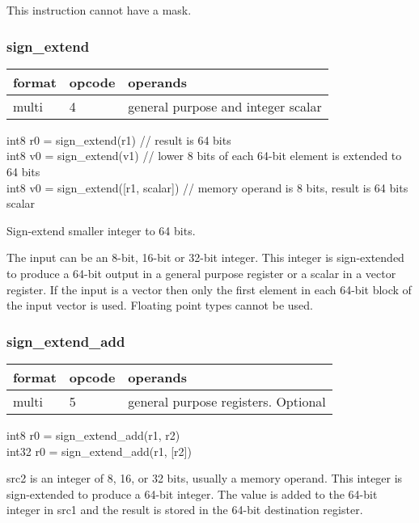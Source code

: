 \documentclass[forwardcom.tex]{subfiles}
\begin{document}
This instruction cannot have a mask.


\subsubsection{sign\_extend}
\label{table:signExtendInstruction}
\begin{tabular}{|p{12mm}|p{12mm}|p{110mm}|}
\hline
\bfseries format & \bfseries opcode & \bfseries operands \\ \hline
multi & 4 & general purpose and integer scalar \\ \hline
\end{tabular}
\vspace{2mm}

int8 r0 = sign\_extend(r1)  // result is 64 bits\\
int8 v0 = sign\_extend(v1)  // lower 8 bits of each 64-bit element is extended to 64 bits\\
int8 v0 = sign\_extend([r1, scalar]) // memory operand is 8 bits, result is 64 bits scalar
\vspace{2mm}

Sign-extend smaller integer to 64 bits.

\vspace{2mm}
The input can be an 8-bit, 16-bit or 32-bit integer. This integer is sign-extended to produce a 64-bit output in a general purpose register or a scalar in a vector register. If the input is a vector then only the first element in each 64-bit block of the input vector is used. Floating point types cannot be used.

\subsubsection{sign\_extend\_add}
\label{table:signExtendAddInstruction}
\begin{tabular}{|p{12mm}|p{12mm}|p{110mm}|}
\hline
\bfseries format & \bfseries opcode & \bfseries operands \\ \hline
multi & 5 & general purpose registers. Optional \\ \hline
\end{tabular}
\vspace{2mm}

int8 r0 = sign\_extend\_add(r1, r2) \\ 
int32 r0 = sign\_extend\_add(r1, [r2])
\vspace{2mm}

src2 is an integer of 8, 16, or 32 bits, usually a memory operand.
This integer is sign-extended to produce a 64-bit integer. The value is added to the 
64-bit integer in src1 and the result is stored in the 64-bit destination register.
\vspace{2mm}
\end{document}
